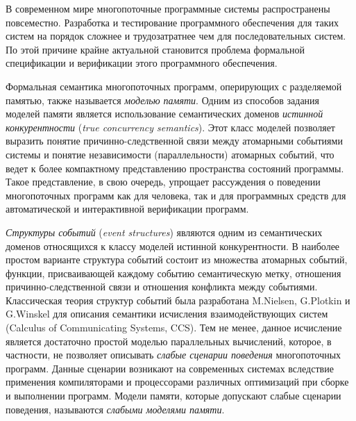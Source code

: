 
{\actuality} 
В современном мире многопоточные программные системы распространены повсеместно. 
Разработка и тестирование программного обеспечения для таких систем на порядок 
сложнее и трудозатратнее чем для последовательных систем. 
По этой причине крайне актуальной становится проблема 
формальной спецификации и верификации этого программного обеспечения. 

Формальная семантика многопоточных программ, оперирующих с разделяемой памятью,
также называется \emph{моделью памяти}.
Одним из способов задания моделей памяти
является использование семантических доменов
\emph{истинной конкурентности} (\emph{true concurrency semantics}).
Этот класс моделей позволяет выразить
понятие причинно-следственной связи между атомарными событиями системы
и понятие независимости (параллельности) атомарных событий,
что ведет к более компактному представлению пространства состояний программы.
Такое представление, в свою очередь, упрощает рассуждения 
о поведении многопоточных программ как для человека, 
так и для программных средств для автоматической и интерактивной верификации программ. 

\emph{Структуры событий} (\emph{event structures}) являются одним из семантических доменов 
относящихся к классу моделей истинной конкурентности.
В наиболее простом варианте структура событий состоит из множества атомарных событий,
функции, присваивающей каждому событию семантическую метку,
отношения причинно-следственной связи и отношения конфликта между событиями.
Классическая теория структур событий была разработана M.Nielsen, G.Plotkin и G.Winskel
для описания семантики исчисления взаимодействующих систем (Calculus of Communicating Systems, CCS).
Тем не менее, данное исчисление является достаточно простой моделью параллельных вычислений,
которое, в частности, не позволяет описывать 
\emph{слабые сценарии поведения} многопоточных программ.
Данные сценарии возникают на современных системах вследствие 
применения компиляторами и процессорами
различных оптимизаций при сборке и выполнении программ.
Модели памяти, которые допускают слабые сценарии поведения, называются \emph{слабыми моделями памяти}.

